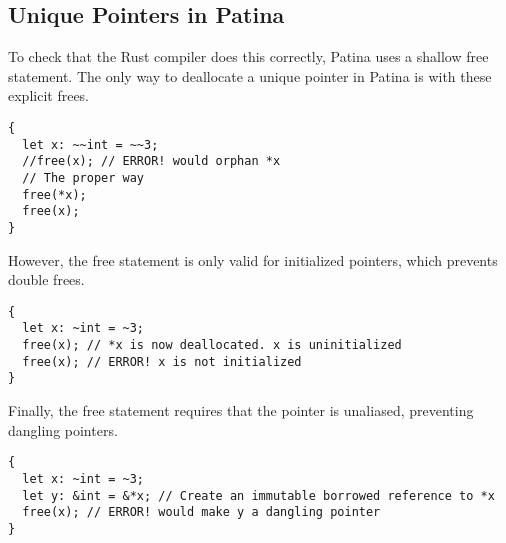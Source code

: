 \subsection*{Unique Pointers in Patina}
To check that the Rust compiler does this correctly, Patina uses a shallow free statement.
The only way to deallocate a unique pointer in Patina is with these explicit frees.
\begin{verbatim}
{
  let x: ~~int = ~~3;
  //free(x); // ERROR! would orphan *x
  // The proper way
  free(*x);
  free(x);
}
\end{verbatim}
However, the free statement is only valid for initialized pointers, which prevents double frees.
\begin{verbatim}
{
  let x: ~int = ~3;
  free(x); // *x is now deallocated. x is uninitialized
  free(x); // ERROR! x is not initialized
}
\end{verbatim}
Finally, the free statement requires that the pointer is unaliased, preventing dangling pointers.
\begin{verbatim}
{
  let x: ~int = ~3;
  let y: &int = &*x; // Create an immutable borrowed reference to *x
  free(x); // ERROR! would make y a dangling pointer
}
\end{verbatim}

